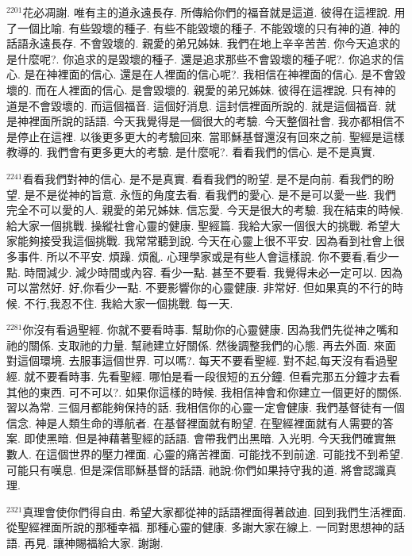\documentclass{book}
\begin{document}
$^{2201}$花必凋謝.
唯有主的道永遠長存.
所傳給你們的福音就是這道.
彼得在這裡說.
用了一個比喻.
有些毀壞的種子.
有些不能毀壞的種子.
不能毀壞的只有神的道.
神的話語永遠長存.
不會毀壞的.
親愛的弟兄姊妹.
我們在地上辛辛苦苦.
你今天追求的是什麼呢?.
你追求的是毀壞的種子.
還是追求那些不會毀壞的種子呢?.
你追求的信心.
是在神裡面的信心.
還是在人裡面的信心呢?.
我相信在神裡面的信心.
是不會毀壞的.
而在人裡面的信心.
是會毀壞的.
親愛的弟兄姊妹.
彼得在這裡說.
只有神的道是不會毀壞的.
而這個福音.
這個好消息.
這封信裡面所說的.
就是這個福音.
就是神裡面所說的話語.
今天我覺得是一個很大的考驗.
今天整個社會.
我亦都相信不是停止在這裡.
以後更多更大的考驗回來.
當耶穌基督還沒有回來之前.
聖經是這樣教導的.
我們會有更多更大的考驗.
是什麼呢?.
看看我們的信心.
是不是真實.

$^{2241}$看看我們對神的信心.
是不是真實.
看看我們的盼望.
是不是向前.
看我們的盼望.
是不是從神的旨意.
永恆的角度去看.
看我們的愛心.
是不是可以愛一些.
我們完全不可以愛的人.
親愛的弟兄姊妹.
信忘愛.
今天是很大的考驗.
我在結束的時候.
給大家一個挑戰.
操縱社會心靈的健康.
聖經篇.
我給大家一個很大的挑戰.
希望大家能夠接受我這個挑戰.
我常常聽到說.
今天在心靈上很不平安.
因為看到社會上很多事件.
所以不平安.
煩躁.
煩亂.
心理學家或是有些人會這樣說.
你不要看,看少一點.
時間減少.
減少時間或內容.
看少一點.
甚至不要看.
我覺得未必一定可以.
因為可以當然好.
好,你看少一點.
不要影響你的心靈健康.
非常好.
但如果真的不行的時候.
不行,我忍不住.
我給大家一個挑戰.
每一天.

$^{2281}$你沒有看過聖經.
你就不要看時事.
幫助你的心靈健康.
因為我們先從神之嘴和祂的關係.
支取祂的力量.
幫祂建立好關係.
然後調整我們的心態.
再去外面.
來面對這個環境.
去服事這個世界.
可以嗎?.
每天不要看聖經.
對不起,每天沒有看過聖經.
就不要看時事.
先看聖經.
哪怕是看一段很短的五分鐘.
但看完那五分鐘才去看其他的東西.
可不可以?.
如果你這樣的時候.
我相信神會和你建立一個更好的關係.
習以為常.
三個月都能夠保持的話.
我相信你的心靈一定會健康.
我們基督徒有一個信念.
神是人類生命的導航者.
在基督裡面就有盼望.
在聖經裡面就有人需要的答案.
即使黑暗.
但是神藉著聖經的話語.
會帶我們出黑暗.
入光明.
今天我們確實無數人.
在這個世界的壓力裡面.
心靈的痛苦裡面.
可能找不到前途.
可能找不到希望.
可能只有嘆息.
但是深信耶穌基督的話語.
祂說:你們如果持守我的道.
將會認識真理.

$^{2321}$真理會使你們得自由.
希望大家都從神的話語裡面得著啟迪.
回到我們生活裡面.
從聖經裡面所說的那種幸福.
那種心靈的健康.
多謝大家在線上.
一同對思想神的話語.
再見.
讓神賜福給大家.
謝謝.
\newpage
\end{document}

